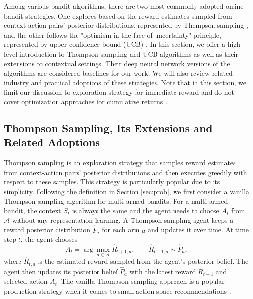 Among various bandit algorithms, there are two most commonly adopted online bandit strategies. One explores based on the reward estimates sampled from context-action pairs' posterior distributions, represented by Thompson sampling \cite{thompson1933likelihood}, and the other follows the "optimism in the face of uncertainty" principle, represented by upper confidence bound (UCB) \cite{agrawal1995sample, auer2002finite}. In this section, we offer a high level introduction to Thompson sampling and UCB algorithms as well as their extensions to contextual settings. Their deep neural network versions of the algorithms are considered baselines for our work. We will also review related industry and practical adoptions of these strategies. Note that in this section, we limit our discussion to exploration strategy for immediate reward and do not cover optimization approaches for cumulative returns \cite{zhu2023deep, xu2023optimize, chen2021exploration}.

\subsection{Thompson Sampling, Its Extensions and Related Adoptions} \label{sec:ts}
Thompson sampling is an exploration strategy that samples reward estimates from context-action pairs' posterior distributions and then executes greedily with respect to these samples. This strategy is particularly popular due to its simplicity. Following the definition in Section \ref{sec:prob}, we first consider a vanilla Thompson sampling algorithm \cite{thompson1933likelihood} for multi-armed bandits. For a multi-armed bandit, the context $S_t$ is always the same and the agent needs to choose $A_t$ from $\mathcal{A}$ without any representation learning. A Thompson sampling agent keeps a reward posterior distribution $\hat{P}_{a}$ for each arm $a$ and updates it over time. At time step $t$, the agent chooses
\begin{equation}
    A_t = \arg\max_{a \in \mathcal{A}} \hat{R}_{t+1, a}, \qquad \hat{R}_{t+1, a} \sim \hat{P}_a,
\end{equation}
where $\hat{R}_{t, a}$ is the estimated reward sampled from the agent's posterior belief. The agent then updates its posterior belief $\hat{P}_{a}$ with the latest reward $R_{t+1}$ and selected action $A_t$. The vanilla Thompson sampling approach is a popular production strategy when it comes to small action space recommendations \cite{sanz2019simple, hsieh2015efficient}. 

